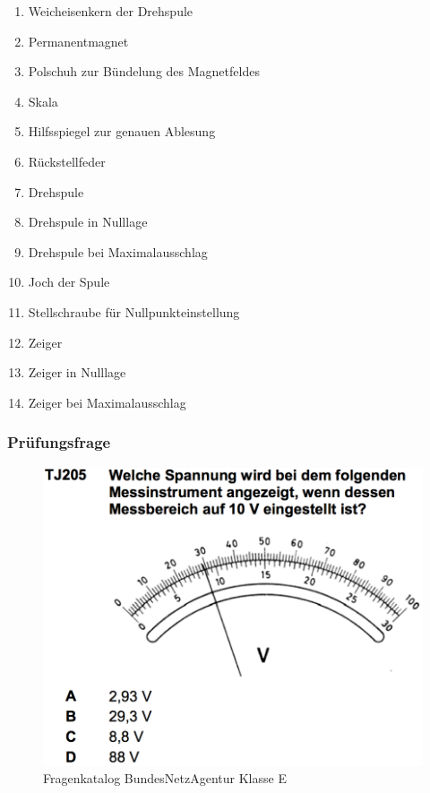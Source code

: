 \begin{frame}
\begin{minipage}{0.3\textwidth}
\begin{figure}
    \end{figure}
  \end{minipage}
  \begin{minipage}{0.65\textwidth}
    \begin{enumerate} \footnotesize
      \item  Weicheisenkern der Drehspule
      \item  Permanentmagnet
      \item  Polschuh zur Bündelung des Magnetfeldes
      \item  Skala
      \item  Hilfsspiegel zur genauen Ablesung
      \item  Rückstellfeder
      \item  Drehspule
      \item  Drehspule in Nulllage
      \item  Drehspule bei Maximalausschlag
      \item  Joch der Spule
      \item  Stellschraube für Nullpunkteinstellung
      \item  Zeiger
      \item  Zeiger in Nulllage
      \item  Zeiger bei Maximalausschlag
    \end{enumerate}
  \end{minipage}
\end{frame}

\begin{frame}
  \frametitle{Prüfungsfrage}
  \begin{center}
    \begin{figure}
      \includegraphics[width=.95\textwidth,height=.75\textheight,keepaspectratio]{e17/messbereich.png}
      \caption{Fragenkatalog BundesNetzAgentur Klasse E}
    \end{figure}
  \end{center}
\end{frame}

